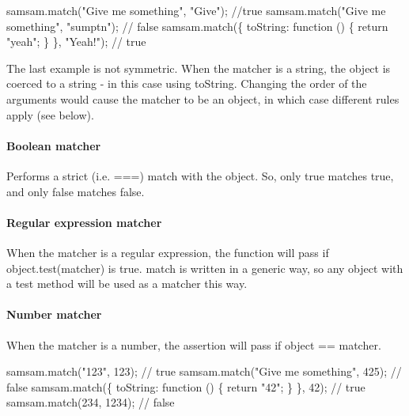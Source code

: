 \begin{DoxyCode}
samsam.match("Give me something", "Give"); //true
samsam.match("Give me something", "sumptn"); // false
samsam.match(\{ toString: function () \{ return "yeah"; \} \}, "Yeah!"); // true
\end{DoxyCode}


The last example is not symmetric. When the matcher is a string, the {\ttfamily object} is coerced to a string -\/ in this case using {\ttfamily to\+String}. Changing the order of the arguments would cause the matcher to be an object, in which case different rules apply (see below).

\paragraph*{Boolean matcher}

Performs a strict (i.\+e. {\ttfamily ===}) match with the object. So, only {\ttfamily true} matches {\ttfamily true}, and only {\ttfamily false} matches {\ttfamily false}.

\paragraph*{Regular expression matcher}

When the matcher is a regular expression, the function will pass if {\ttfamily object.\+test(matcher)} is {\ttfamily true}. {\ttfamily match} is written in a generic way, so any object with a {\ttfamily test} method will be used as a matcher this way.




\paragraph*{Number matcher}

When the matcher is a number, the assertion will pass if {\ttfamily object == matcher}.


\begin{DoxyCode}
samsam.match("123", 123); // true
samsam.match("Give me something", 425); // false
samsam.match(\{ toString: function () \{ return "42"; \} \}, 42); // true
samsam.match(234, 1234); // false
\end{DoxyCode}


